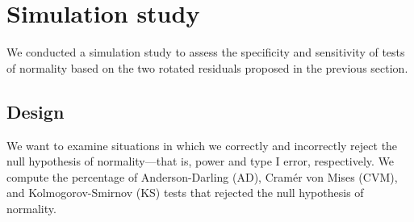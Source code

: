 \documentclass[12pt]{article} %
\newcommand{\hh}[1]{{\color{orange} #1}}
\newcommand{\al}[1]{{\color{red} #1}}
\newcommand{\trans}{\ensuremath{^\prime}}
\begin{document}


\section{Simulation study}\label{sec:simulation}

We conducted a simulation study to assess the specificity and sensitivity of tests of normality based on the two rotated residuals proposed in the previous section. 

\subsection{Design}\label{sec:sim-design}

We want to examine situations in which we correctly and incorrectly reject the null hypothesis of normality---that is, power and type I error, respectively. We compute the percentage of Anderson-Darling (AD), Cram{\'e}r von Mises (CVM), and Kolmogorov-Smirnov (KS) tests that rejected the null hypothesis of normality.
\end{document}
